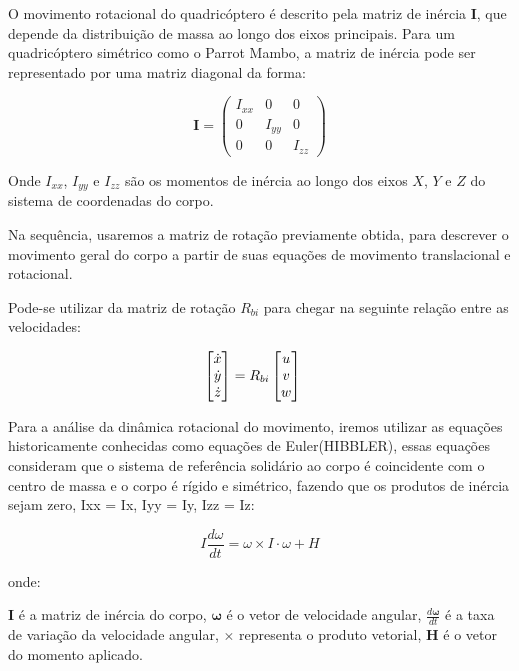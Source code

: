 O movimento rotacional do quadricóptero é descrito pela matriz de inércia \( \boldsymbol{I} \), que depende da distribuição de massa ao longo dos eixos principais. Para um quadricóptero simétrico como o Parrot Mambo, a matriz de inércia pode ser representado por uma matriz diagonal da forma:

\[
	\boldsymbol{I} = \begin{pmatrix}
		I_{xx} & 0      & 0      \\
		0      & I_{yy} & 0      \\
		0      & 0      & I_{zz}
	\end{pmatrix}
\]

Onde \( I_{xx} \), \( I_{yy} \) e \( I_{zz} \) são os momentos de inércia ao longo dos eixos \( X \), \( Y \) e \( Z \) do sistema de coordenadas do corpo.


Na sequência,  usaremos a matriz de rotação previamente obtida, para descrever o movimento geral do corpo a partir de suas equações de movimento translacional e rotacional.

Pode-se utilizar da matriz de rotação $R_{bi}$ para chegar na seguinte relação entre as
velocidades:


\begin{align*}
	\begin{bmatrix}
		$$ \dot{x} $$ \\
		$$ \dot{y} $$ \\
		$$ \dot{z} $$ \\
	\end{bmatrix}
	 & = R_{bi}
	\begin{bmatrix}
		u \\
		v \\
		w \\
	\end{bmatrix}
\end{align*}

Para a análise da dinâmica rotacional do movimento, iremos utilizar as equações historicamente conhecidas como equações de Euler(HIBBLER), essas equações consideram que o sistema de referência solidário ao corpo é coincidente com o centro de massa e o corpo é rígido e simétrico, fazendo que os produtos de inércia sejam zero, Ixx = Ix, Iyy = Iy, Izz = Iz:

\begin{equation}
	I \frac{d\omega}{dt} = \omega \times I \cdot \omega + H
\end{equation}

onde:

$\mathbf{I}$ é a matriz de inércia do corpo,
$\boldsymbol{\omega}$ é o vetor de velocidade angular,
$\frac{d\boldsymbol{\omega}}{dt}$ é a taxa de variação da velocidade angular,
$\times$ representa o produto vetorial,
$\boldsymbol{H}$ é o vetor do momento aplicado.

